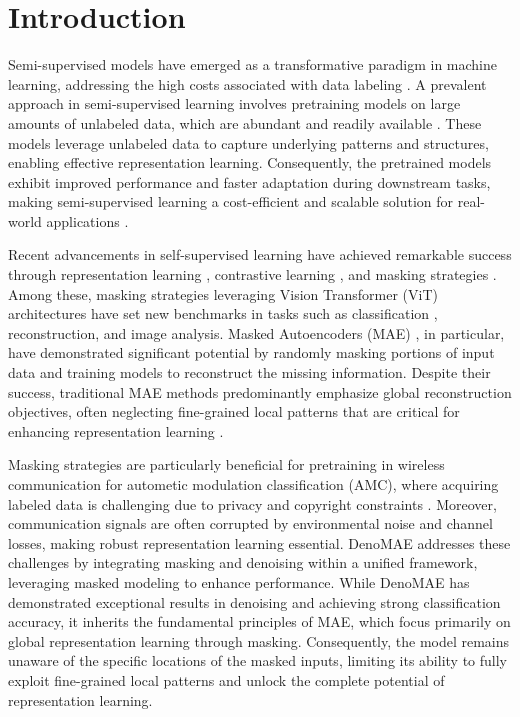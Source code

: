 \section{Introduction}

Semi-supervised models have emerged as a transformative paradigm in machine learning, addressing the high costs associated with data labeling \cite{zhang2024maskmatch, pmlr-v182-poulain22a}. A prevalent approach in semi-supervised learning involves pretraining models on large amounts of unlabeled data, which are abundant and readily available \cite{chen2020bigselfsupervisedmodelsstrong, xu2022revisitingpretrainingsemisupervisedlearning}. These models leverage unlabeled data to capture underlying patterns and structures, enabling effective representation learning. Consequently, the pretrained models exhibit improved performance and faster adaptation during downstream tasks, making semi-supervised learning a cost-efficient and scalable solution for real-world applications \cite{cai2022semisupervisedvisiontransformersscale}.

Recent advancements in self-supervised learning have achieved remarkable success through representation learning \cite{grill2020bootstraplatentnewapproach, chen2020exploringsimplesiameserepresentation}, contrastive learning \cite{chen2020simple, khosla2020supervised}, and masking strategies \cite{devlin2019bertpretrainingdeepbidirectional, yin2024stablemask}. Among these, masking strategies leveraging Vision Transformer (ViT) \cite{dosovitskiy2020image} architectures have set new benchmarks in tasks such as classification , reconstruction, and image analysis. Masked Autoencoders (MAE) \cite{he2021maskedautoencodersscalablevision}, in particular, have demonstrated significant potential by randomly masking portions of input data and training models to reconstruct the missing information. Despite their success, traditional MAE methods predominantly emphasize global reconstruction objectives, often neglecting fine-grained local patterns that are critical for enhancing representation learning \cite{yue2023understanding}.

Masking strategies are particularly beneficial for pretraining in wireless communication for autometic modulation classification (AMC), where acquiring labeled data is challenging due to privacy and copyright constraints \cite{zhao2024vit, zayat2023transformer}. Moreover, communication signals are often corrupted by environmental noise and channel losses, making robust representation learning essential. DenoMAE \cite{faysal2025denomae} addresses these challenges by integrating masking and denoising within a unified framework, leveraging masked modeling to enhance performance. While DenoMAE has demonstrated exceptional results in denoising and achieving strong classification accuracy, it inherits the fundamental principles of MAE, which focus primarily on global representation learning through masking. Consequently, the model remains unaware of the specific locations of the masked inputs, limiting its ability to fully exploit fine-grained local patterns and unlock the complete potential of representation learning.

